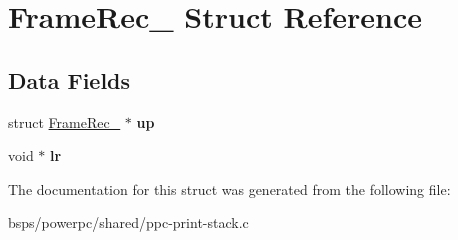 \hypertarget{structFrameRec__}{}\section{Frame\+Rec\+\_\+ Struct Reference}
\label{structFrameRec__}
\subsection*{Data Fields}
\begin{DoxyCompactItemize}
\item 
\mbox{\label{structFrameRec___a94ddcb74f4ab134edfaa5779fbe02b55}} 
struct \mbox{\hyperlink{structFrameRec__}{Frame\+Rec\+\_\+}} $\ast$ {\bfseries up}
\item 
\mbox{\label{structFrameRec___a0488138f56838293526dff5ae34054f2}} 
void $\ast$ {\bfseries lr}
\end{DoxyCompactItemize}


The documentation for this struct was generated from the following file\+:\begin{DoxyCompactItemize}
\item 
bsps/powerpc/shared/ppc-\/print-\/stack.\+c\end{DoxyCompactItemize}
